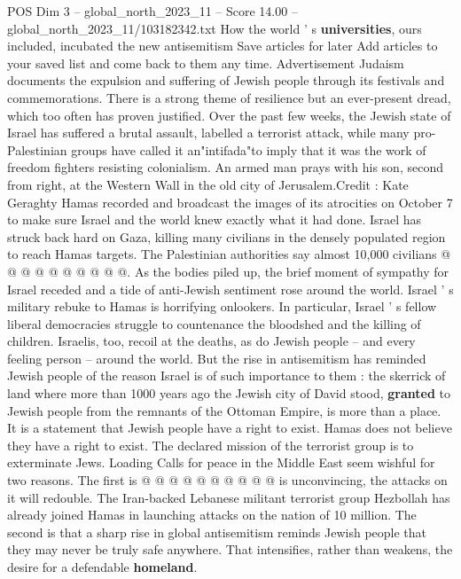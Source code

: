\begin{textsample}{POS Dim 3 – global\_north\_2023\_11 – Score 14.00 – global\_north\_2023\_11/103182342.txt}  \label{ex:f3_pos_185}
How the world ' s \textbf{universities}, ours included, incubated the new antisemitism Save articles for later Add articles to your saved list and come back to them any time.
Advertisement Judaism documents the expulsion and suffering of Jewish people through its festivals and commemorations.
There is a strong theme of resilience but an ever-present dread, which too often has proven justified.
Over the past few weeks, the Jewish state of Israel has suffered a brutal assault, labelled a terrorist attack, while many pro-Palestinian groups have called it an"intifada"to imply that it was the work of freedom fighters resisting colonialism.
An armed man prays with his son, second from right, at the Western Wall in the old city of Jerusalem.Credit : Kate Geraghty Hamas recorded and broadcast the images of its atrocities on October 7 to make sure Israel and the world knew exactly what it had done.
Israel has struck back hard on Gaza, killing many civilians in the densely populated region to reach Hamas targets.
The Palestinian authorities say almost 10,000 civilians @ @ @ @ @ @ @ @ @ @.
As the bodies piled up, the brief moment of sympathy for Israel receded and a tide of anti-Jewish sentiment rose around the world.
Israel ' s military rebuke to Hamas is horrifying onlookers.
In particular, Israel ' s fellow liberal democracies struggle to countenance the bloodshed and the killing of children.
Israelis, too, recoil at the deaths, as do Jewish people -- and every feeling person -- around the world.
But the rise in antisemitism has reminded Jewish people of the reason Israel is of such importance to them : the skerrick of land where more than 1000 years ago the Jewish city of David stood, \textbf{granted} to Jewish people from the remnants of the Ottoman Empire, is more than a place.
It is a statement that Jewish people have a right to exist.
Hamas does not believe they have a right to exist.
The declared mission of the terrorist group is to exterminate Jews.
Loading Calls for peace in the Middle East seem wishful for two reasons.
The first is @ @ @ @ @ @ @ @ @ @ is unconvincing, the attacks on it will redouble.
The Iran-backed Lebanese militant terrorist group Hezbollah has already joined Hamas in launching attacks on the nation of 10 million.
The second is that a sharp rise in global antisemitism reminds Jewish people that they may never be truly safe anywhere.
That intensifies, rather than weakens, the desire for a defendable \textbf{homeland}.

\end{textsample}
